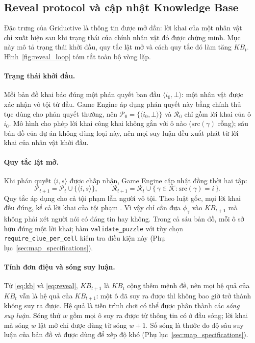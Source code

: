 \subsection{Reveal protocol và cập nhật Knowledge Base}
\label{sec:reveal_protocol}

Đặc trưng của Griductive là thông tin được mở dần: lời khai của một nhân vật chỉ
xuất hiện sau khi trạng thái của chính nhân vật đó được chứng minh. Mục này mô
tả trạng thái khởi đầu, quy tắc lật mở và cách quy tắc đó làm tăng
$\mathit{KB}_t$. Hình~\ref{fig:reveal_loop} tóm tắt toàn bộ vòng lặp.

\paragraph{Trạng thái khởi đầu.}
Mỗi bản đồ khai báo đúng một phán quyết ban đầu $\langle i_0, \bot\rangle$:
một nhân vật được xác nhận vô tội từ đầu. Game Engine áp dụng phán quyết này
bằng chính thủ tục dùng cho phán quyết thường, nên
$\mathcal{P}_0 = \{\langle i_0, \bot\rangle\}$ và $\mathcal{R}_0$ chỉ gồm lời
khai của ô $i_0$. Mô hình cho phép lời khai công khai không gắn với ô nào
($\mathrm{src}(\gamma)$ rỗng); sáu bản đồ của dự án không dùng loại này, nên
mọi suy luận đều xuất phát từ lời khai của nhân vật khởi đầu.

\paragraph{Quy tắc lật mở.}
Khi phán quyết $\langle i, s\rangle$ được chấp nhận, Game Engine cập nhật đồng
thời hai tập:
\begin{equation}
  \mathcal{P}_{t+1} = \mathcal{P}_t \cup \{\langle i, s\rangle\},
  \qquad
  \mathcal{R}_{t+1} = \mathcal{R}_t \cup
    \{\, \gamma \in \mathcal{K} : \mathrm{src}(\gamma) = i \,\}.
  \label{eq:reveal}
\end{equation}
Quy tắc áp dụng cho cả tội phạm lẫn người vô tội. Theo luật gốc, mọi lời khai
đều đúng, kể cả lời khai của tội phạm \cite{griductive_rules}. Vì vậy chỉ cần
đưa $\phi_\gamma$ vào $\mathit{KB}_{t+1}$ mà không phải xét người nói có đáng
tin hay không. Trong cả sáu bản đồ, mỗi ô sở hữu đúng một lời khai; hàm
\texttt{validate\_puzzle} với tùy chọn \texttt{require\_clue\_per\_cell}
kiểm tra điều kiện này (Phụ lục~\ref{sec:map_specifications}).

\paragraph{Tính đơn điệu và sóng suy luận.}
Từ \eqref{eq:kb} và \eqref{eq:reveal}, $\mathit{KB}_{t+1}$ là $\mathit{KB}_t$
cộng thêm mệnh đề, nên mọi hệ quả của $\mathit{KB}_t$ vẫn là hệ quả của
$\mathit{KB}_{t+1}$: một ô đã suy ra được thì không bao giờ trở thành không suy
ra được. Hệ quả là tiến trình chơi có thể được phân thành các \emph{sóng suy
luận}. Sóng thứ $w$ gồm mọi ô suy ra được từ thông tin có ở đầu sóng; lời khai
mà sóng $w$ lật mở chỉ được dùng từ sóng $w+1$. Số sóng là thước đo độ sâu
suy luận của bản đồ và được dùng để xếp độ khó (Phụ lục~\ref{sec:map_specifications}).

